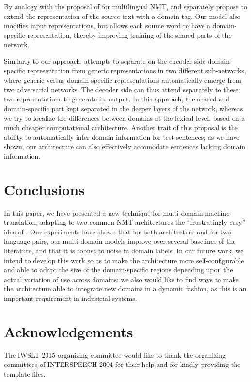 \documentclass[a4paper]{article}
\newcommand{\fyDone}[1]{\done[FY]\Todo[FY:]{\textcolor{orange}{#1}}}
\begin{document}
By analogy with the proposal of \cite{Johnson17google} for multilingual NMT, \cite{Kobus17domaincontrol} and \cite{Chu18multilingual} separately propose to extend the representation of the source text with a domain tag. Our model also modifies input representations, but allows each source word to have a domain-specific representation, thereby improving training of the shared parts of the network.\fyDone{Talk about target embeddings somewhere.} 

Similarly to our approach, \cite{Zeng18multidomain} attempts to separate on the encoder side domain-specific representation from generic representations in two different sub-networks, where generic versus domain-specific representations automatically emerge from two adversarial networks. The decoder side can thus attend separately to these two representations to generate its output. In this approach, the shared and domain-specific part kept separated in the deeper layers of the network, whereas we try to localize the differences between domains at the lexical level, based on a much cheaper computational architecture. Another trait of this proposal is the ability to automatically infer domain information for test sentences; as we have shown, our architecture can also effectively accomodate sentences lacking domain information.

\section{Conclusions}
In this paper, we have presented a new technique for multi-domain machine translation, adapting to two common NMT architectures the ``frustratingly easy'' idea of \cite{Daume07frustratingly}. Our experiments have shown that for both architecture and for two language pairs, our multi-domain models improve over several baselines of the literature, and that it is robust to noise in domain labels. In our future work, we intend to develop this work so as to make the architecture more self-configurable and able to adapt the size of the domain-specific regions depending upon the actual variation of use across domains; we also would like to find ways to make the architecture able to integrate new domains in a dynamic fashion, as this is an important requirement in industrial systems.

\section{Acknowledgements}
The IWSLT 2015 organizing committee would like to thank the
organizing committees of INTERSPEECH 2004 for their
help and for kindly providing the template files.

%


\end{document}

